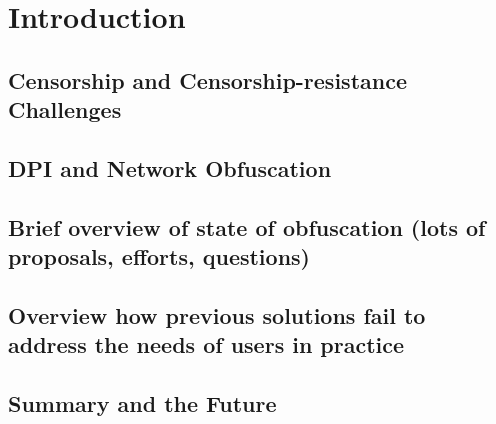%
\section{Introduction}
\label{section:intro}



\subsection{Censorship and Censorship-resistance Challenges}

\subsection{DPI and Network Obfuscation}

\subsection{Brief overview of state of obfuscation (lots of proposals, efforts, questions)}

\subsection{Overview how previous solutions fail to address the needs of users
in practice}

\subsection{Summary and the Future}
  

	

